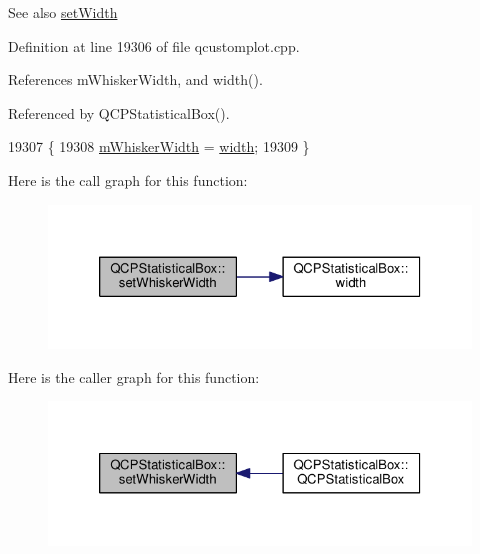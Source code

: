 \begin{DoxySeeAlso}{See also}
\hyperlink{class_q_c_p_statistical_box_a0b62775bd67301b1eba5c785f2b26f14}{set\+Width} 
\end{DoxySeeAlso}


Definition at line 19306 of file qcustomplot.\+cpp.



References m\+Whisker\+Width, and width().



Referenced by Q\+C\+P\+Statistical\+Box().


\begin{DoxyCode}
19307 \{
19308   \hyperlink{class_q_c_p_statistical_box_a4d166474f845d5db626e8b11a0815a6f}{mWhiskerWidth} = \hyperlink{class_q_c_p_statistical_box_a0733a7bd575fc5929ce6d507bcc2a04c}{width};
19309 \}
\end{DoxyCode}


Here is the call graph for this function\+:\nopagebreak
\begin{figure}[H]
\begin{center}
\leavevmode
\includegraphics[width=326pt]{class_q_c_p_statistical_box_adf378812446bd66f34d1f7f293d991cd_cgraph}
\end{center}
\end{figure}




Here is the caller graph for this function\+:\nopagebreak
\begin{figure}[H]
\begin{center}
\leavevmode
\includegraphics[width=326pt]{class_q_c_p_statistical_box_adf378812446bd66f34d1f7f293d991cd_icgraph}
\end{center}
\end{figure}


